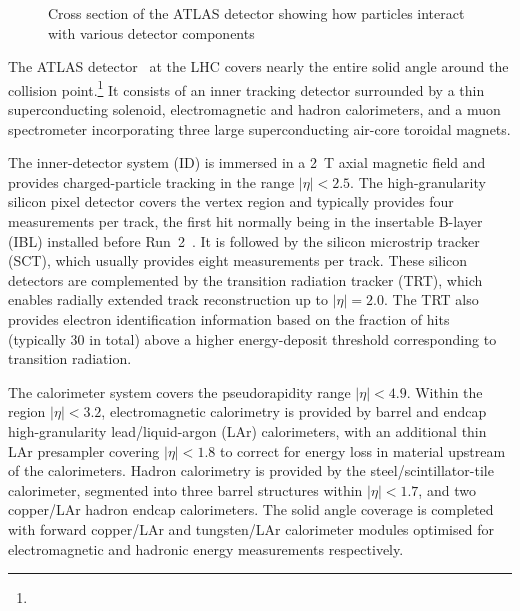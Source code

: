 \begin{figure}[ht]
\centering
{}
\caption{Cross section of the ATLAS detector showing how particles interact with various detector components \cite{ShowerImage}}
\end{figure}

The ATLAS detector~\cite{PERF-2007-01} at the LHC covers nearly the entire solid angle around the collision point.\footnote{\AtlasCoordFootnote}
It consists of an inner tracking detector surrounded by a thin superconducting solenoid, electromagnetic and hadron calorimeters,
and a muon spectrometer incorporating three large superconducting air-core toroidal magnets.

The inner-detector system (ID) is immersed in a \SI{2}{\tesla} axial magnetic field 
and provides charged-particle tracking in the range \(|\eta| < 2.5\).
The high-granularity silicon pixel detector covers the vertex region and typically provides four measurements per track, 
the first hit normally being in the insertable B-layer (IBL) installed before Run~2~\cite{ATLAS-TDR-19,PIX-2018-001}.
It is followed by the silicon microstrip tracker (SCT), which usually provides eight measurements per track.
These silicon detectors are complemented by the transition radiation tracker (TRT),
which enables radially extended track reconstruction up to \(|\eta| = 2.0\). 
The TRT also provides electron identification information 
based on the fraction of hits (typically 30 in total) above a higher energy-deposit threshold corresponding to transition radiation.

The calorimeter system covers the pseudorapidity range \(|\eta| < 4.9\).
Within the region \(|\eta|< 3.2\), electromagnetic calorimetry is provided by barrel and 
endcap high-granularity lead/liquid-argon (LAr) calorimeters,
with an additional thin LAr presampler covering \(|\eta| < 1.8\)
to correct for energy loss in material upstream of the calorimeters.
Hadron calorimetry is provided by the steel/scintillator-tile calorimeter,
segmented into three barrel structures within \(|\eta| < 1.7\), and two copper/LAr hadron endcap calorimeters.
The solid angle coverage is completed with forward copper/LAr and tungsten/LAr calorimeter modules
optimised for electromagnetic and hadronic energy measurements respectively.

